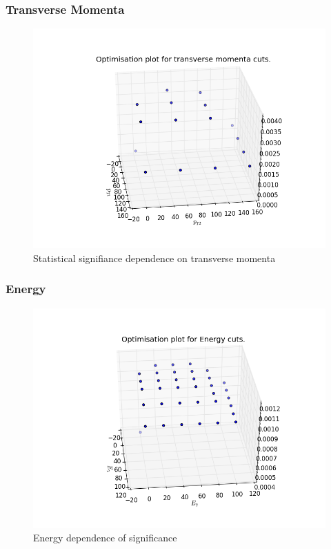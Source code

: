 \documentclass{article}
\begin{document}
\subsubsection{Transverse Momenta}
\begin{figure}
\includegraphics[scale=0.5]{transverse6}
\caption{Statistical signifiance dependence on transverse momenta}
\end{figure}
\subsubsection{Energy}
\begin{figure}
\includegraphics[scale=0.5]{energy6}
\caption{Energy dependence of significance}
\end{figure}
\end{document}

